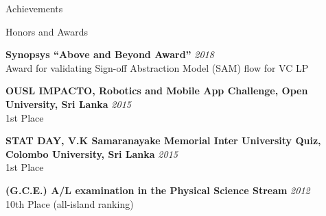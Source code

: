 \documentclass[
11pt, %
]{./assets/resume} %
\begin{document}


 
\begin{rSection}{Achievements}



\end{rSection}
\begin{rSection}{Honors and Awards}

	\textbf{Synopsys “Above and Beyond Award”} \hfill \textit{2018}\\
	Award for validating Sign-off Abstraction Model (SAM) flow for VC LP

	\textbf{OUSL IMPACTO, Robotics and Mobile App Challenge, Open University, Sri Lanka} \hfill \textit{2015}\\
	1st Place

	\textbf{STAT DAY, V.K Samaranayake Memorial Inter University Quiz, Colombo University, Sri Lanka} \hfill \textit{2015}\\
	1st Place

	\textbf{(G.C.E.) A/L examination in the Physical Science Stream} \hfill \textit{2012}\\
	10th Place (all-island ranking)

\end{rSection}
\end{document}
